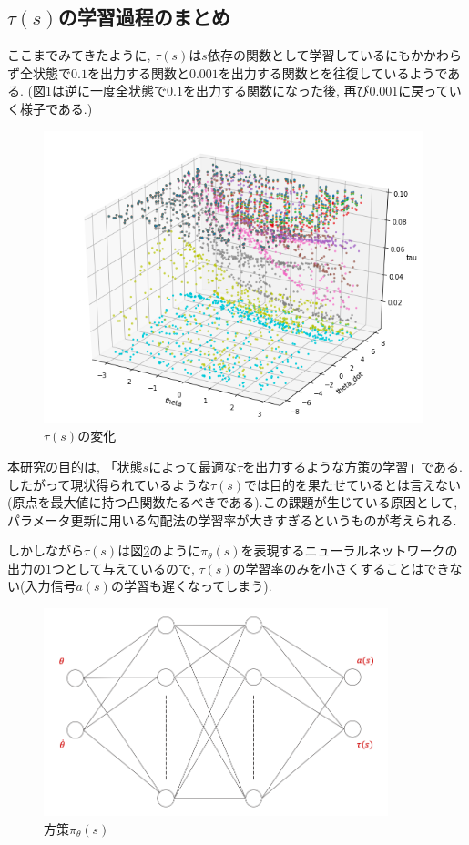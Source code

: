 \documentclass{jsarticle}
\begin{document}
\subsection{$\tau(s)$の学習過程のまとめ}
ここまでみてきたように, $\tau(s)$は$s$依存の関数として学習しているにもかかわらず全状態で$0.1$を出力する関数と$0.001$を出力する関数とを往復しているようである. (図\ref{tau_fall}は逆に一度全状態で$0.1$を出力する関数になった後, 再び0.001に戻っていく様子である.)
\begin{figure}[h]
	\centering
 	\includegraphics[width=11cm]{tau_fall.png}
 	\caption{$\tau(s)$の変化}  \label{tau_fall}
\end{figure}\par
\newpage
本研究の目的は, 「状態$s$によって最適な$\tau$を出力するような方策の学習」である. したがって現状得られているような$\tau(s)$では目的を果たせているとは言えない(原点を最大値に持つ凸関数たるべきである).この課題が生じている原因として, パラメータ更新に用いる勾配法の学習率が大きすぎるというものが考えられる.\par
しかしながら$\tau(s)$は図\ref{actor_NN}のように$\pi_{\theta}(s)$を表現するニューラルネットワークの出力の1つとして与えているので, $\tau(s)$の学習率のみを小さくすることはできない(入力信号$a(s)$の学習も遅くなってしまう).
\begin{figure}[h]
	\centering
 	\includegraphics[width=10cm]{actor_NN.png}
 	\caption{方策$\pi_{\theta}(s)$}  \label{actor_NN}
\end{figure}\\
\end{document}
